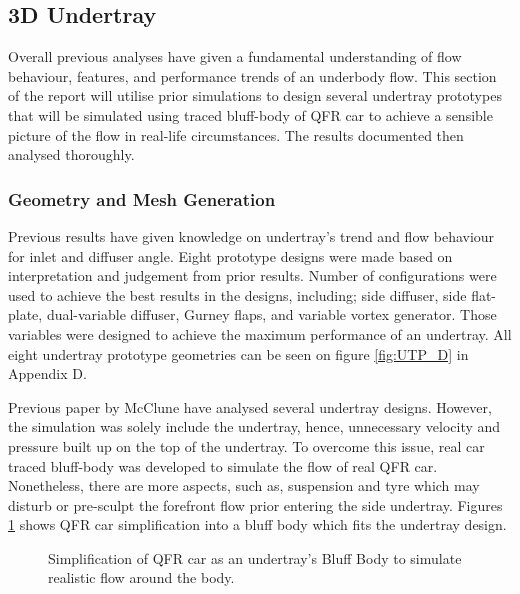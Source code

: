 
\subsection{3D Undertray}
Overall previous analyses have given a fundamental understanding of flow behaviour, features, and performance trends of an underbody flow. This section of the report will utilise prior simulations to design several undertray prototypes that will be simulated using traced bluff-body of QFR car to achieve a sensible picture of the flow in real-life circumstances. The results documented then analysed thoroughly.

\subsubsection{Geometry and Mesh Generation}
\noindent Previous results have given knowledge on undertray's trend and flow behaviour for inlet and diffuser angle. Eight prototype designs were made based on interpretation and judgement from prior results. Number of configurations were used to achieve the best results in the designs, including; side diffuser, side flat-plate, dual-variable diffuser, Gurney flaps, and variable vortex generator. Those variables were designed to achieve the maximum performance of an undertray. All eight undertray prototype geometries can be seen on figure \ref{fig:UTP_D} in Appendix D.

\noindent Previous paper by McClune \cite{McClune2018DesignCar} have analysed several undertray designs. However, the simulation was solely include the undertray, hence, unnecessary velocity and pressure built up on the top of the undertray. To overcome this issue, real car traced bluff-body was developed to simulate the flow of real QFR car. Nonetheless, there are more aspects, such as, suspension and tyre which may disturb or pre-sculpt the forefront flow prior entering the side undertray. Figures \ref{fig:3D_UT_BB_SIMPLIFICATION} shows QFR car simplification into a bluff body which fits the undertray design.

\begin{figure}[!htb] %
    \centering
    \noindent{}
    \caption{Simplification of QFR car as an undertray's Bluff Body to simulate realistic flow around the body.}
      \label{fig:3D_UT_BB_SIMPLIFICATION}
\end{figure}

